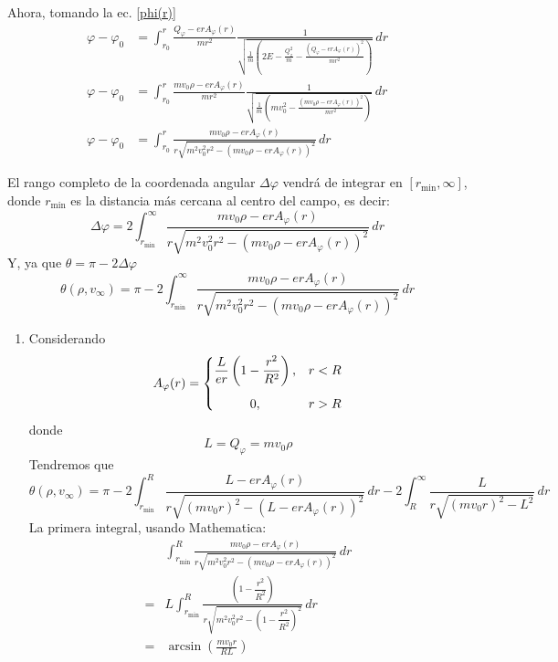 \documentclass[]{article}
\numberwithin{equation}{section}
\newcommand{\0}{\textcolor{gray}{0}}
\begin{document}
\begin{enumerate}
	Ahora, tomando la ec. \ref{phi(r)}
	\begin{align}
		\varphi - \varphi_0 &= \int_{r_0}^{r} \frac{Q_\varphi - e r A_\varphi(r)} {m r^2} \frac{1}{\sqrt{\frac{1}{m} \left(2 E - \frac{Q_z^2}{m} - \frac{(Q_\varphi - e r A_\varphi(r))^2}{m r^2}\right)}} \, dr \nonumber\\
		\varphi - \varphi_0 &= \int_{r_0}^{r} \frac{m v_0 \rho - e r A_\varphi(r)} {m r^2} \frac{1}{\sqrt{\frac{1}{m} \left(m v_0^2- \frac{(m v_0 \rho - e r A_\varphi(r))^2}{m r^2}\right)}} \, dr\nonumber\\
		\varphi - \varphi_0 &= \int_{r_0}^{r} \frac{m v_0 \rho - e r A_\varphi(r)}{r \sqrt{m^2 v_0^2 r^2  - (m v_0 \rho - e r A_\varphi(r))^2}} \, dr
	\end{align}
	
	El rango completo de la coordenada angular \(\Delta \varphi\) vendrá de integrar en \([r_\mathrm{min}, \infty]\), donde \(r_\mathrm{min}\) es la distancia más cercana al centro del campo, es decir:
	\begin{equation}
		\Delta \varphi = 2\int_{r_\mathrm{min}}^{\infty} \frac{m v_0 \rho - e r A_\varphi(r)}{r \sqrt{m^2 v_0^2 r^2  - (m v_0 \rho - e r A_\varphi(r))^2}} \, dr
	\end{equation}
	Y, ya que \(\theta = \pi - 2\Delta\varphi\)
	\begin{equation}
		\theta(\rho, v_\infty) =  \pi - 2\int_{r_\mathrm{min}}^{\infty} \frac{m v_0 \rho - e r A_\varphi(r)}{r \sqrt{m^2 v_0^2 r^2  - (m v_0 \rho - e r A_\varphi(r))^2}} \, dr
	\end{equation}
	\begin{enumerate}
		\item[i.] Considerando
		\begin{equation}
			A_\varphi(r) = \left\lbrace \begin{matrix}
				\dfrac{L}{e r}\left(1 - \dfrac{r^2}{R^2}\right), & r < R \vspace{3mm}\\
				0, & r > R
			\end{matrix}\right.
		\end{equation}
		donde
		\begin{equation}
			L = Q_\varphi = m v_0 \rho
		\end{equation}
		Tendremos que
		\begin{equation}
			\theta(\rho, v_\infty) =  \pi - 2\int_{r_\mathrm{min}}^{R} \frac{L - e r A_\varphi(r)}{r \sqrt{(m v_0 r)^2 - (L - e r A_\varphi(r))^2}} \, dr - 2\int_{R}^{\infty} \frac{L}{r \sqrt{(m v_0 r)^2  - L^2}} \, dr
		\end{equation}
		La primera integral, usando Mathematica:
		\begin{align}
			&\int_{r_\mathrm{min}}^{R} \frac{m v_0 \rho - e r A_\varphi(r)}{r \sqrt{m^2 v_0^2 r^2  - (m v_0 \rho - e r A_\varphi(r))^2}} \, dr \nonumber\\
			=& L \int_{r_\mathrm{min}}^{R} \frac{\left(1 - \dfrac{r^2}{R^2}\right)}{r \sqrt{m^2 v_0^2 r^2  - \left(1 - \dfrac{r^2}{R^2}\right)^2}} \, dr \nonumber\\
			=& \arcsin\left(\frac{m v_0 r}{R L}\right)
		\end{align}
		

\end{enumerate}
\end{enumerate}
\end{document}
